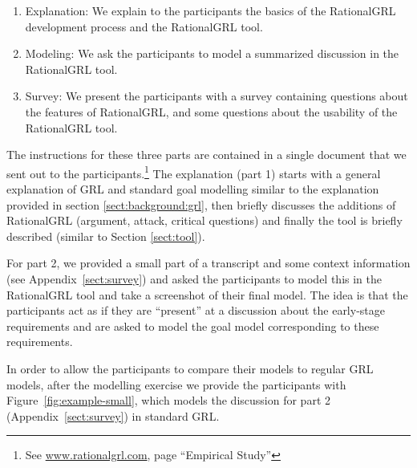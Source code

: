 \begin{enumerate}
\item Explanation: We explain to the participants the basics of the RationalGRL development process and the RationalGRL tool.
\item Modeling: We ask the participants to model a summarized discussion in the RationalGRL tool.
\item Survey: We present the participants with a survey containing questions about the features of RationalGRL, and some questions about the usability of the RationalGRL tool.
\end{enumerate}

The instructions for these three parts are contained in a single document that we sent out to the participants.\footnote{See \url{www.rationalgrl.com}, page ``Empirical Study''} The explanation (part 1) starts with a general explanation of GRL and standard goal modelling similar to the explanation provided in section \ref{sect:background:grl}, then briefly discusses the additions of RationalGRL (argument, attack, critical questions) and finally the tool is briefly described (similar to Section \ref{sect:tool}). 

For part 2, we provided a small part of a transcript and some context information (see Appendix~\ref{sect:survey}) and asked the participants to model this in the RationalGRL tool and take a screenshot of their final model. The idea is that the participants act as if they are ``present'' at a discussion about the early-stage requirements and are asked to model the goal model corresponding to these requirements. 

In order to allow the participants to compare their models to regular GRL models, after the modelling exercise we provide the participants with Figure~\ref{fig:example-small}, which models the discussion for part 2 (Appendix~\ref{sect:survey}) in standard GRL.

